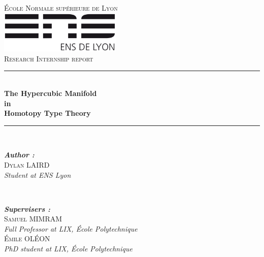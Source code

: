 \documentclass{report}
\begin{document}
\begin{titlepage}
\newcommand{\HRule}{\rule{\linewidth}{0.5mm}} %

\center %


\textsc{\LARGE École Normale supérieure de Lyon}\\[1cm] %
\includegraphics[height=2cm, keepaspectratio]{École_normale_supérieure_de_Lyon_Logo.svg.png}\\[1cm]

\textsc{\LARGE Research Internship report}\\[1.25cm]
\HRule \\[0.4cm]
{ \huge \bfseries The Hypercubic Manifold}\\[0.3cm]
{ \huge \bfseries in}\\[0.5cm] 
{ \huge \bfseries Homotopy Type Theory}\\[0.3cm]
\HRule \\[2cm]
\begin{minipage}{0.4\textwidth}
\begin{flushleft}
\emph{\Large \emph{\textbf{Author :}}}\\[0.2cm]
\textsc{\Large Dylan LAIRD}\\
\textit{Student at ENS Lyon}
\end{flushleft}
\end{minipage}
~
\begin{minipage}{0.4\textwidth}
\begin{flushleft}
\emph{\Large \emph{\textbf{Supervisers :}}}\\[0.2cm]
\textsc{\Large Samuel MIMRAM}\\
\textit{Full Professor at LIX, École Polytechnique}\\[0.1cm]
\textsc{\Large Émile OLÉON}\\
\textit{PhD student at LIX, École Polytechnique}\\
\end{flushleft}
\end{minipage}\\[0.5cm]


\end{titlepage}
\end{document}
